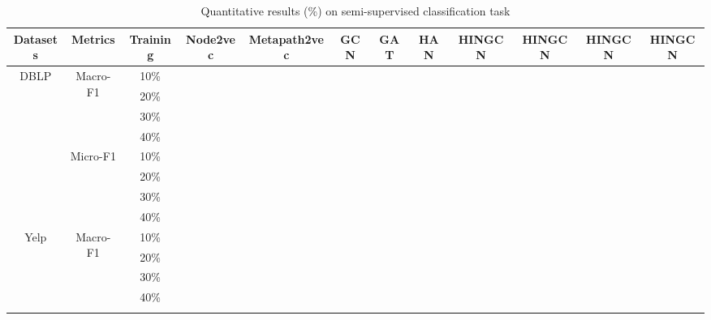 \begin{table*}[!htbp]
\centering
\caption{Quantitative results (\%) on semi-supervised classification task}
\label{tab:result}
\begin{tabular}{|c|c|c||c|c|c|c|c||c|c|c|c|}
\hline
Datasets                  & Metrics                   & Training & Node2vec & Metapath2vec & GCN & GAT & HAN & HINGCN & HINGCN & HINGCN & HINGCN \\ \hline
\multirow{8}{*}{DBLP}     & \multirow{4}{*}{Macro-F1} & 10\%     &          &              &     &     &     &        &        &        &        \\
                          &                           & 20\%     &          &              &     &     &     &        &        &        &        \\
                          &                           & 30\%     &          &              &     &     &     &        &        &        &        \\
                          &                           & 40\%     &          &              &     &     &     &        &        &        &        \\ \cline{2-12} 
                          & \multirow{4}{*}{Micro-F1} & 10\%     &          &              &     &     &     &        &        &        &        \\
                          &                           & 20\%     &          &              &     &     &     &        &        &        &        \\
                          &                           & 30\%     &          &              &     &     &     &        &        &        &        \\
                          &                           & 40\%     &          &              &     &     &     &        &        &        &        \\ \hline
\multirow{8}{*}{Yelp}     & \multirow{4}{*}{Macro-F1} & 10\%     &          &              &     &     &     &        &        &        &        \\
                          &                           & 20\%     &          &              &     &     &     &        &        &        &        \\
                          &                           & 30\%     &          &              &     &     &     &        &        &        &        \\
                          &                           & 40\%     &          &              &     &     &     &        &        &        &        \\ \cline{2-12} 

\end{tabular}
\end{table*}
